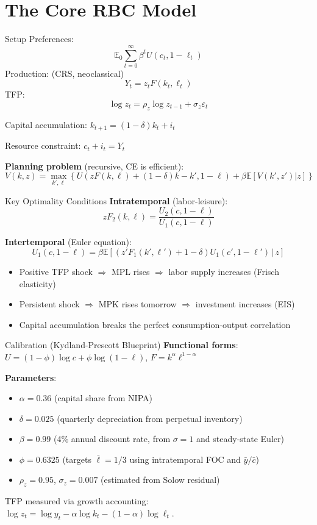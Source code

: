 \documentclass[blue]{beamer}
\newcommand{\E}{\mathbb{E}}
\begin{document}
\section{The Core RBC Model}

\begin{frame}{Setup}
	Preferences: 
	$$
	\E_0 \sum_{t=0}^{\infty} \beta^t U(c_t, 1-\ell_t)
	$$
	Production: (CRS, neoclassical)
	$$
	Y_t = z_t F(k_t, \ell_t)
	$$  
	TFP: 
	$$
	\log z_t = \rho_z \log z_{t-1} + \sigma_z \varepsilon_t
	$$
	
	Capital accumulation: $k_{t+1} = (1-\delta) k_t + i_t$
	
	Resource constraint: $c_t + i_t = Y_t$
	
	\bigskip
	\textbf{Planning problem} (recursive, CE is efficient):
	\[
	V(k, z) = \max_{k', \ell} \left\{ U(zF(k, \ell) + (1-\delta)k - k', 1-\ell) + \beta \E[V(k', z') | z] \right\}
	\]
\end{frame}

\begin{frame}{Key Optimality Conditions}
	\textbf{Intratemporal} (labor-leisure):
	\[
	z F_2(k, \ell) = \frac{U_2(c, 1-\ell)}{U_1(c, 1-\ell)}
	\]
	
	\textbf{Intertemporal} (Euler equation):
	\[
	U_1(c, 1-\ell) = \beta \E\left[(z' F_1(k', \ell') + 1-\delta) U_1(c', 1-\ell') \,\big|\, z\right]
	\]
	
	\begin{itemize}
		\item Positive TFP shock $\Rightarrow$ MPL rises $\Rightarrow$ labor supply increases (Frisch elasticity)
		\item Persistent shock $\Rightarrow$ MPK rises tomorrow $\Rightarrow$ investment increases (EIS)
		\item Capital accumulation breaks the perfect consumption-output correlation
	\end{itemize}
\end{frame}

\begin{frame}{Calibration (Kydland-Prescott Blueprint)}
	\textbf{Functional forms}: $U = (1-\phi)\log c + \phi \log(1-\ell)$, $F = k^\alpha \ell^{1-\alpha}$
	
	\bigskip
	\textbf{Parameters}:
	\begin{itemize}
		\item $\alpha = 0.36$ (capital share from NIPA)
		\item $\delta = 0.025$ (quarterly depreciation from perpetual inventory)
		\item $\beta = 0.99$ (4\% annual discount rate, from $\sigma = 1$ and steady-state Euler)
		\item $\phi = 0.6325$ (targets $\bar{\ell} = 1/3$ using intratemporal FOC and $\bar{y}/\bar{c}$)
		\item $\rho_z = 0.95$, $\sigma_z = 0.007$ (estimated from Solow residual)
	\end{itemize}
	
	\bigskip
	TFP measured via growth accounting: $\log z_t = \log y_t - \alpha \log k_t - (1-\alpha) \log \ell_t$.
\end{frame}
\end{document}
